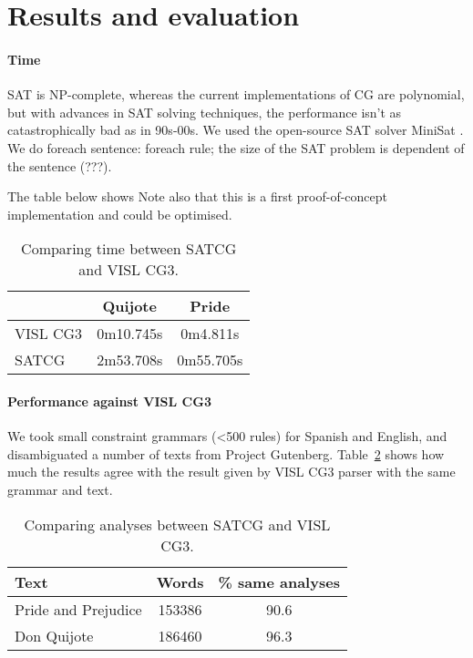 \documentclass[11pt]{article}
\begin{document}
\section{Results and evaluation}

\paragraph{Time}

SAT is NP-complete, whereas the current implementations of CG are polynomial, 
but with advances in SAT solving techniques, the performance isn't as catastrophically bad as in 90s-00s.
We used the open-source SAT solver MiniSat \cite{een04sat}.
We do foreach sentence: foreach rule; 
the size of the SAT problem is dependent of the sentence (???).

The table below shows
Note also that this is a first proof-of-concept implementation and could be optimised.

\begin{table}
  \centering
  \begin{tabular}{|l|c|c|}
     \hline
	         & Quijote      & Pride \\ \hline
  VISL CG3 & 0m10.745s & 0m4.811s \\ \hline
  SATCG    & 2m53.708s & 0m55.705s \\ \hline
  \end{tabular}
  \caption{Comparing time between SATCG and VISL CG3.}
  \label{table:time}
\end{table}

\paragraph{Performance against VISL CG3}
We took small constraint grammars (\textless{}500 rules) for Spanish and English, and disambiguated a number of texts from Project Gutenberg. Table~\ref{table:results} shows how much the results agree with the result given by VISL CG3 parser with the same grammar and text.

\begin{table}
  \centering
  \begin{tabular}{|l|c|c|}
     \hline
    \textbf{Text} & \textbf{Words} & \textbf{\% same analyses} \\
    \hline
	Pride and Prejudice & 153386 & 90.6 \\  
    \hline
       Don Quijote & 186460 & 96.3  \\ 
     \hline
  \end{tabular}
  \caption{Comparing analyses between SATCG and VISL CG3.}
  \label{table:results}
\end{table}
\end{document}
